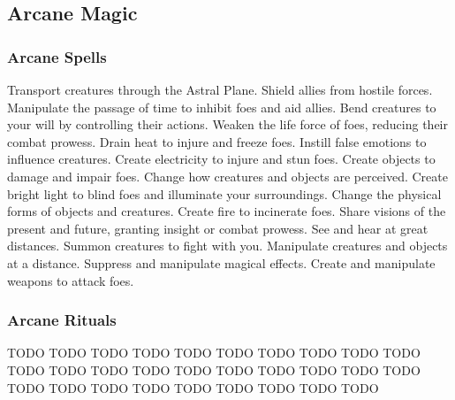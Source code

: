 
\small
\subsection{Arcane Magic}\label{Arcane Magic}
\subsubsection{Arcane Spells}\label{Arcane Spells}
\begin{spelllist}
 Transport creatures through the Astral Plane.
 Shield allies from hostile forces.
 Manipulate the passage of time to inhibit foes and aid allies.
 Bend creatures to your will by controlling their actions.
 Weaken the life force of foes, reducing their combat prowess.
 Drain heat to injure and freeze foes.
 Instill false emotions to influence creatures.
 Create electricity to injure and stun foes.
 Create objects to damage and impair foes.
 Change how creatures and objects are perceived.
 Create bright light to blind foes and illuminate your surroundings.
 Change the physical forms of objects and creatures.
 Create fire to incinerate foes.
 Share visions of the present and future, granting insight or combat prowess.
 See and hear at great distances.
 Summon creatures to fight with you.
 Manipulate creatures and objects at a distance.
 Suppress and manipulate magical effects.
 Create and manipulate weapons to attack foes.
\end{spelllist}
\subsubsection{Arcane Rituals}\label{Arcane Rituals}
\begin{spelllist}
 TODO
 TODO
 TODO
 TODO
 TODO
 TODO
 TODO
 TODO
 TODO
 TODO
 TODO
 TODO
 TODO
 TODO
 TODO
 TODO
 TODO
 TODO
 TODO
 TODO
 TODO
 TODO
 TODO
 TODO
 TODO
 TODO
 TODO
 TODO
 TODO
\end{spelllist}




